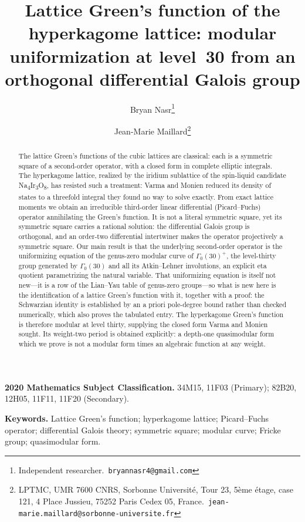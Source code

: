 \documentclass[11pt]{article}
\title{Lattice Green's function of the hyperkagome lattice: modular uniformization at level~30
from an orthogonal differential Galois group}
\author{%
Bryan Nasr\thanks{Independent researcher.\ \texttt{bryannasr4@gmail.com}}
\and
Jean-Marie Maillard\thanks{LPTMC, UMR 7600 CNRS, Sorbonne Universit\'e, Tour 23, 5\`eme
\'etage, case 121, 4 Place Jussieu, 75252 Paris Cedex 05, France.\
\texttt{jean-marie.maillard@sorbonne-universite.fr}}%
}
\date{}
\theoremstyle{plain}
\theoremstyle{remark}
\begin{document}
\maketitle

\begin{abstract}
The lattice Green's functions of the cubic lattices are classical: each is a symmetric square of a
second-order operator, with a closed form in complete elliptic integrals. The hyperkagome lattice,
realized by the iridium sublattice of the spin-liquid candidate
Na\textsubscript{4}Ir\textsubscript{3}O\textsubscript{8}, has resisted such
a treatment: Varma and Monien reduced its density of states to a threefold integral they found no way
to solve exactly. From exact lattice moments we obtain an irreducible third-order linear differential
(Picard--Fuchs) operator annihilating the Green's function. It is not a literal symmetric square, yet its symmetric
square carries a rational solution: the differential Galois group is orthogonal, and an order-two
differential intertwiner makes the operator projectively a symmetric square. Our main result is that the
underlying second-order operator is the uniformizing equation of the genus-zero modular curve of
$\Gamma_0(30)^+$, the level-thirty group generated by $\Gamma_0(30)$ and all its Atkin--Lehner
involutions, an explicit eta quotient parametrizing the natural variable. That uniformizing
equation is itself not new---it is a row of the Lian--Yau table of genus-zero groups---so what is
new here is the identification of a lattice Green's function with it, together with a proof: the
Schwarzian identity is established by an a priori pole-degree bound rather than checked
numerically, which also proves the tabulated entry. The hyperkagome Green's function is therefore
modular at level thirty, supplying the closed form Varma and Monien sought. Its weight-two period
is obtained explicitly: a depth-one quasimodular form which we prove is not a modular form times
an algebraic function at any weight.
\end{abstract}

\noindent\textbf{2020 Mathematics Subject Classification.}
34M15, 11F03 (Primary); 82B20, 12H05, 11F11, 11F20 (Secondary).

\medskip
\noindent\textbf{Keywords.}
Lattice Green's function; hyperkagome lattice; Picard--Fuchs operator; differential Galois
theory; symmetric square; modular curve; Fricke group; quasimodular form.
\end{document}
